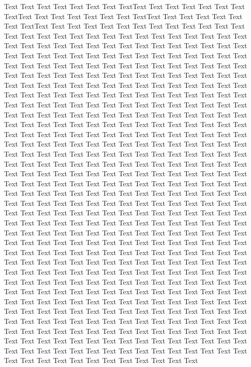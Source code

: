 \documentclass{bioinfo}
\begin{document}
%
Text Text Text Text Text Text  Text TextText Text Text Text Text Text  Text TextText Text Text Text Text Text  Text TextText Text Text Text Text Text  Text TextText Text Text Text Text Text  Text Text Text Text Text Text Text Text  Text Text Text Text Text Text Text Text  Text Text Text Text Text Text Text Text  Text Text Text Text Text Text Text Text  Text Text Text Text Text Text Text Text  Text Text Text Text Text Text Text Text  Text Text Text Text Text Text Text Text  Text Text Text Text Text Text Text Text  Text Text Text Text Text Text Text Text  Text Text Text Text Text Text Text Text  Text Text Text Text Text Text Text Text  Text Text Text Text Text Text Text Text  Text Text Text Text Text Text Text Text  Text Text Text Text Text Text Text Text  Text Text Text Text Text Text Text Text  Text Text Text Text Text Text Text Text  Text Text Text Text Text Text Text Text  Text Text Text Text Text Text Text Text  Text Text Text Text Text Text Text Text  Text Text Text Text Text Text Text Text  Text Text Text Text Text Text Text Text  Text Text Text Text Text Text Text Text  Text Text Text Text Text Text Text Text  Text Text Text Text Text Text Text Text  Text Text Text Text Text Text Text Text  Text Text Text Text Text Text Text Text  Text Text Text Text Text Text Text Text  Text Text Text Text Text Text Text Text  Text Text Text Text Text Text Text Text  Text Text Text Text Text Text Text Text  Text Text Text Text Text Text Text Text  Text Text Text Text Text Text Text Text  Text Text Text Text Text Text Text Text  Text Text Text Text Text Text Text Text  Text Text Text Text Text Text Text Text  Text Text Text Text Text Text Text Text  Text Text Text Text Text Text Text Text  Text Text Text Text Text Text Text Text  Text Text Text Text Text Text Text Text  Text Text Text Text Text Text Text Text  Text Text Text Text Text Text Text Text  Text Text Text Text Text Text Text Text  Text Text Text Text Text Text Text Text  Text Text Text Text Text Text Text Text  Text Text Text Text Text Text Text Text  Text Text Text Text Text Text Text Text  Text Text Text Text Text Text Text Text  Text Text Text Text Text Text Text Text  Text Text Text Text Text Text Text Text  Text Text Text Text Text Text Text Text  Text Text Text Text Text Text Text Text  Text Text Text Text Text Text Text Text  Text Text Text Text Text Text Text Text  Text Text Text Text Text Text Text Text  Text Text Text Text Text Text Text Text  Text Text Text Text Text Text Text Text  Text Text Text Text Text Text Text Text  Text Text Text Text Text Text Text Text  Text Text Text Text Text Text Text Text  Text Text Text Text Text Text Text Text  Text Text Text Text Text Text Text Text  Text Text Text Text Text Text Text Text  Text Text Text Text Text Text Text Text  Text Text Text Text Text Text Text Text  Text Text  
\end{document}
